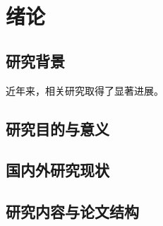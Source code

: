 
\chapter{绪论}

\section{研究背景}

近年来，相关研究取得了显著进展\cite{he2016deep}。

\section{研究目的与意义}

\section{国内外研究现状}

\section{研究内容与论文结构}

